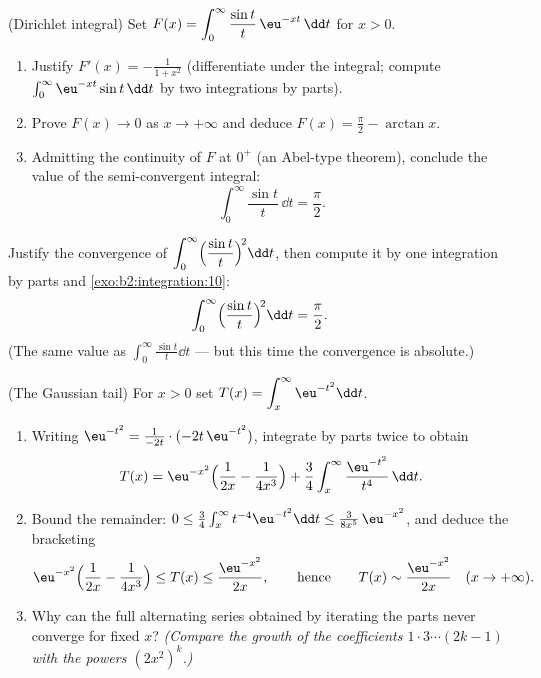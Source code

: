 \begin{exercise}[$\star\star\star$]\label{exo:b2:integration:10}
(Dirichlet integral) Set $F(x) = \displaystyle\int_0^{\infty}
\frac{\sin t}{t}\,\eu^{-xt}\,\dd t$ for $x > 0$.
\begin{enumerate}
  \item Justify $F'(x) = -\frac{1}{1 + x^2}$ (differentiate under
        the integral; compute $\int_0^\infty \eu^{-xt}\sin t\,\dd
        t$ by two integrations by parts).
  \item Prove $F(x) \to 0$ as $x \to +\infty$ and deduce $F(x) =
        \frac\pi2 - \arctan x$.
  \item Admitting the continuity of $F$ at $0^+$ (an Abel-type
        theorem), conclude the value of the semi-convergent
        integral:
        \[
        \int_0^{\infty} \frac{\sin t}{t}\,\dd t = \frac{\pi}{2}.
        \]
\end{enumerate}
\end{exercise}

\begin{exercise}[$\star\star$]\label{exo:b2:integration:11}
Justify the convergence of $\displaystyle\int_0^\infty
\Bigl(\frac{\sin t}{t}\Bigr)^{\!2}\dd t$, then compute it by one
integration by parts and \cref{exo:b2:integration:10}:
\[
\int_0^\infty \Bigl(\frac{\sin t}{t}\Bigr)^{\!2}\dd t
= \frac{\pi}{2} .
\]
(The same value as $\int_0^\infty \frac{\sin t}{t}\dd t$ --- but
this time the convergence is absolute.)
\end{exercise}

\begin{exercise}[$\star\star\star$]\label{exo:b2:integration:12}
(The Gaussian tail) For $x > 0$ set $T(x) = \displaystyle
\int_x^\infty \eu^{-t^2}\dd t$.
\begin{enumerate}
  \item Writing $\eu^{-t^2} = \frac{1}{-2t}\cdot(-2t\,\eu^{-t^2})$,
        integrate by parts twice to obtain
        \[
        T(x) = \eu^{-x^2}\Bigl(\frac{1}{2x} -
        \frac{1}{4x^3}\Bigr) +
        \frac34\int_x^\infty \frac{\eu^{-t^2}}{t^4}\,\dd t .
        \]
  \item Bound the remainder: $0 \leq \frac34\int_x^\infty
        t^{-4}\eu^{-t^2}\dd t \leq \frac{3}{8x^5}\,\eu^{-x^2}$,
        and deduce the bracketing
        \[
        \eu^{-x^2}\Bigl(\frac{1}{2x} - \frac{1}{4x^3}\Bigr)
        \leq T(x) \leq \frac{\eu^{-x^2}}{2x},
        \qquad\text{hence}\qquad
        T(x) \sim \frac{\eu^{-x^2}}{2x} \quad (x \to +\infty).
        \]
  \item Why can the full alternating series obtained by iterating
        the parts never converge for fixed $x$? \emph{(Compare the
        growth of the coefficients $1\cdot3\cdots(2k-1)$ with the
        powers $(2x^2)^k$.)}
\end{enumerate}
\end{exercise}

